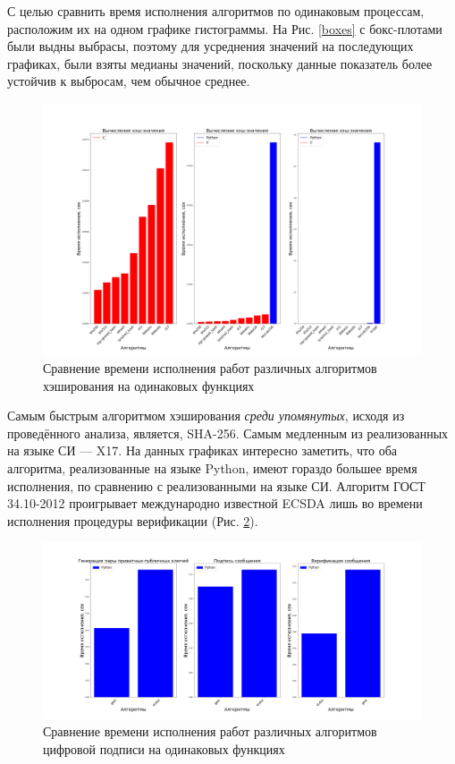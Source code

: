 С целью сравнить время исполнения алгоритмов по одинаковым процессам,
расположим их на одном графике гистограммы.  На Рис. \ref{boxes} с бокс-плотами
были выдны выбрасы, поэтому для усреднения значений на последующих графиках,
были взяты медианы значений, поскольку данные показатель более устойчив к
выбросам, чем обычное среднее.

\begin{figure}[h]
    \centering
    \includegraphics[width=\textwidth]{./images/hash_comparison}
    \caption{Сравнение времени исполнения работ различных алгоритмов хэширования на одинаковых функциях}\label{hash_comp}
\end{figure}

Самым быстрым алгоритмом хэширования \emph{среди упомянутых}, исходя из
проведённого анализа, является, SHA-256. Самым медленным из реализованных на
языке СИ --- X17.  На данных графиках интересно заметить, что оба алгоритма,
реализованные на языке Python, имеют гораздо большее время исполнения, по
сравнению с реализованными на языке СИ. Алгоритм ГОСТ 34.10-2012 проигрывает
международно известной ECSDA лишь во времени исполнения процедуры
верификации (Рис. \ref{dss_comp}).

\begin{figure}[h]
    \centering
    \includegraphics[width=1.\textwidth]{./images/dss_comparison}
    \caption{Сравнение времени исполнения работ различных алгоритмов цифровой подписи на одинаковых функциях}\label{dss_comp}
\end{figure}

